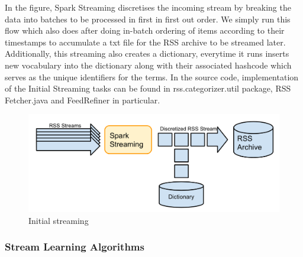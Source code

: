 \documentclass{article} %
\begin{document}
In the figure, Spark Streaming discretises the incoming stream by breaking the data into batches to be processed in first in first out order. We simply run this flow which also does after doing in-batch ordering of items according to their timestamps to accumulate a txt file for the RSS archive to be streamed later. Additionally, this streaming also creates a dictionary, everytime it runs inserts new vocabulary into the dictionary along with their associated hashcode which serves as the unique identifiers for the terms. In the source code, implementation of the Initial Streaming tasks can be found in rss.categorizer.util package, RSS Fetcher.java and FeedRefiner in particular.
\begin{figure}[htbp]
  \centering
  \includegraphics[scale=0.28]{./figures/initial_streaming.png}
  \caption{Initial streaming}
\end{figure}


\subsubsection{Stream Learning Algorithms}
\end{document}

